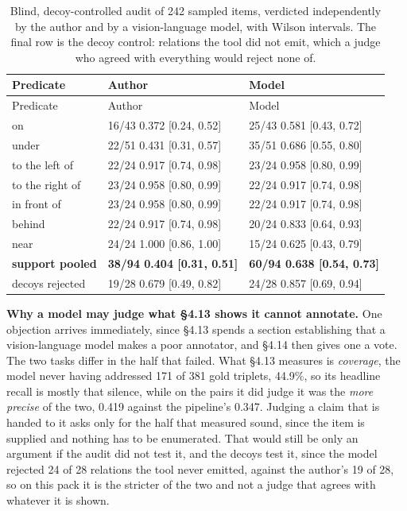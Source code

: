 \begin{center}
\setlength{\tabcolsep}{6pt}
\small
\begin{longtable}{lll}
\caption[Blind, decoy-controlled audit of 242 sampled items, verdicted]{Blind, decoy-controlled audit of 242 sampled items, verdicted independently by the author and by a vision-language model, with Wilson intervals. The final row is the decoy control: relations the tool did not emit, which a judge who agreed with everything would reject none of.}\\
\hline
Predicate & Author & Model \\
\hline
\endfirsthead
\hline
Predicate & Author & Model \\
\hline
\endhead
on & 16/43 0.372 [0.24, 0.52] & 25/43 0.581 [0.43, 0.72] \\
under & 22/51 0.431 [0.31, 0.57] & 35/51 0.686 [0.55, 0.80] \\
to the left of & 22/24 0.917 [0.74, 0.98] & 23/24 0.958 [0.80, 0.99] \\
to the right of & 23/24 0.958 [0.80, 0.99] & 22/24 0.917 [0.74, 0.98] \\
in front of & 23/24 0.958 [0.80, 0.99] & 22/24 0.917 [0.74, 0.98] \\
behind & 22/24 0.917 [0.74, 0.98] & 20/24 0.833 [0.64, 0.93] \\
near & 24/24 1.000 [0.86, 1.00] & 15/24 0.625 [0.43, 0.79] \\
\textbf{support pooled} & \textbf{38/94 0.404 [0.31, 0.51]} & \textbf{60/94 0.638 [0.54, 0.73]} \\
decoys rejected & 19/28 0.679 [0.49, 0.82] & 24/28 0.857 [0.69, 0.94] \\
\hline
\end{longtable}
\end{center}

\textbf{Why a model may judge what \S{}4.13 shows it cannot annotate.} One objection arrives immediately, since \S{}4.13 spends a section establishing that a vision-language model makes a poor annotator, and \S{}4.14 then gives one a vote. The two tasks differ in the half that failed. What \S{}4.13 measures is \textit{coverage}, the model never having addressed 171 of 381 gold triplets, 44.9\%, so its headline recall is mostly that silence, while on the pairs it did judge it was the \textit{more precise} of the two, 0.419 against the pipeline's 0.347. Judging a claim that is handed to it asks only for the half that measured sound, since the item is supplied and nothing has to be enumerated. That would still be only an argument if the audit did not test it, and the decoys test it, since the model rejected 24 of 28 relations the tool never emitted, against the author's 19 of 28, so on this pack it is the stricter of the two and not a judge that agrees with whatever it is shown.

